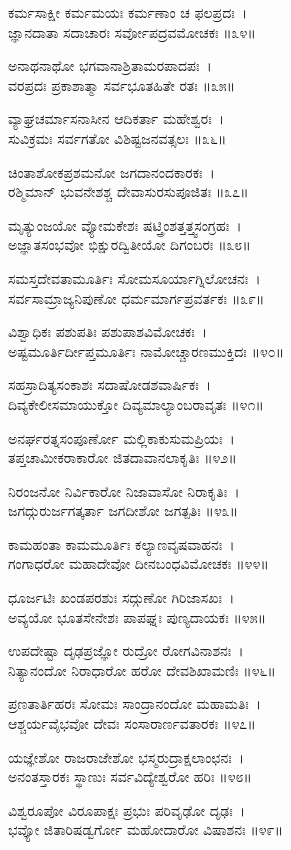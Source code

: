 ಕರ್ಮಸಾಕ್ಷೀ ಕರ್ಮಮಯಃ ಕರ್ಮಣಾಂ ಚ ಫಲಪ್ರದಃ~।\\
ಜ್ಞಾನದಾತಾ ಸದಾಚಾರಃ ಸರ್ವೋಪದ್ರವಮೋಚಕಃ ॥೩೪॥

	ಅನಾಥನಾಥೋ ಭಗವಾನಾಶ್ರಿತಾಮರಪಾದಪಃ~।\\
	ವರಪ್ರದಃ ಪ್ರಕಾಶಾತ್ಮಾ ಸರ್ವಭೂತಹಿತೇ ರತಃ ॥೩೫॥

ವ್ಯಾಘ್ರಚರ್ಮಾಸನಾಸೀನ ಆದಿಕರ್ತಾ ಮಹೇಶ್ವರಃ~।\\
ಸುವಿಕ್ರಮಃ ಸರ್ವಗತೋ ವಿಶಿಷ್ಟಜನವತ್ಸಲಃ ॥೩೬॥

	ಚಿಂತಾಶೋಕಪ್ರಶಮನೋ ಜಗದಾನಂದಕಾರಕಃ~।\\
	ರಶ್ಮಿಮಾನ್ ಭುವನೇಶಶ್ಚ ದೇವಾಸುರಸುಪೂಜಿತಃ ॥೩೭॥

ಮೃತ್ಯುಂಜಯೋ ವ್ಯೋಮಕೇಶಃ ಷಟ್ತ್ರಿಂಶತ್ತತ್ತ್ವಸಂಗ್ರಹಃ~।\\
ಅಜ್ಞಾತಸಂಭವೋ ಭಿಕ್ಷುರದ್ವಿತೀಯೋ ದಿಗಂಬರಃ ॥೩೮॥

	ಸಮಸ್ತದೇವತಾಮೂರ್ತಿಃ ಸೋಮಸೂರ್ಯಾಗ್ನಿಲೋಚನಃ~।\\
	ಸರ್ವಸಾಮ್ರಾಜ್ಯನಿಪುಣೋ ಧರ್ಮಮಾರ್ಗಪ್ರವರ್ತಕಃ ॥೩೯॥

ವಿಶ್ವಾಧಿಕಃ ಪಶುಪತಿಃ ಪಶುಪಾಶವಿಮೋಚಕಃ~।\\
ಅಷ್ಟಮೂರ್ತಿರ್ದೀಪ್ತಮೂರ್ತಿಃ ನಾಮೋಚ್ಚಾರಣಮುಕ್ತಿದಃ ॥೪೦॥

	ಸಹಸ್ರಾದಿತ್ಯಸಂಕಾಶಃ ಸದಾಷೋಡಶವಾರ್ಷಿಕಃ~।\\
	ದಿವ್ಯಕೇಲೀಸಮಾಯುಕ್ತೋ ದಿವ್ಯಮಾಲ್ಯಾಂಬರಾವೃತಃ ॥೪೧॥

ಅನರ್ಘರತ್ನಸಂಪೂರ್ಣೋ ಮಲ್ಲಿಕಾಕುಸುಮಪ್ರಿಯಃ~।\\
ತಪ್ತಚಾಮೀಕರಾಕಾರೋ ಜಿತದಾವಾನಲಾಕೃತಿಃ ॥೪೨॥

	ನಿರಂಜನೋ ನಿರ್ವಿಕಾರೋ ನಿಜಾವಾಸೋ ನಿರಾಕೃತಿಃ~।\\
	ಜಗದ್ಗುರುರ್ಜಗತ್ಕರ್ತಾ ಜಗದೀಶೋ ಜಗತ್ಪತಿಃ ॥೪೩॥

ಕಾಮಹಂತಾ ಕಾಮಮೂರ್ತಿಃ ಕಲ್ಯಾಣವೃಷವಾಹನಃ~।\\
ಗಂಗಾಧರೋ ಮಹಾದೇವೋ ದೀನಬಂಧವಿಮೋಚಕಃ ॥೪೪॥

	ಧೂರ್ಜಟಿಃ ಖಂಡಪರಶುಃ ಸದ್ಗುಣೋ ಗಿರಿಜಾಸಖಃ~।\\
	ಅವ್ಯಯೋ ಭೂತಸೇನೇಶಃ ಪಾಪಘ್ನಃ ಪುಣ್ಯದಾಯಕಃ ॥೪೫॥

ಉಪದೇಷ್ಟಾ ದೃಢಪ್ರಜ್ಞೋ ರುದ್ರೋ ರೋಗವಿನಾಶನಃ~।\\
ನಿತ್ಯಾನಂದೋ ನಿರಾಧಾರೋ ಹರೋ ದೇವಶಿಖಾಮಣಿಃ ॥೪೬॥

	ಪ್ರಣತಾರ್ತಿಹರಃ ಸೋಮಃ ಸಾಂದ್ರಾನಂದೋ ಮಹಾಮತಿಃ~।\\
	ಆಶ್ಚರ್ಯವೈಭವೋ ದೇವಃ ಸಂಸಾರಾರ್ಣವತಾರಕಃ ॥೪೭॥

ಯಜ್ಞೇಶೋ ರಾಜರಾಜೇಶೋ ಭಸ್ಮರುದ್ರಾಕ್ಷಲಾಂಛನಃ~।\\
ಅನಂತಸ್ತಾರಕಃ ಸ್ಥಾಣುಃ ಸರ್ವವಿದ್ಯೇಶ್ವರೋ ಹರಿಃ ॥೪೮॥

	ವಿಶ್ವರೂಪೋ ವಿರೂಪಾಕ್ಷಃ ಪ್ರಭುಃ ಪರಿವೃಢೋ ದೃಢಃ~।\\
	ಭವ್ಯೋ ಜಿತಾರಿಷಡ್ವರ್ಗೋ ಮಹೋದಾರೋ ವಿಷಾಶನಃ ॥೪೯॥

